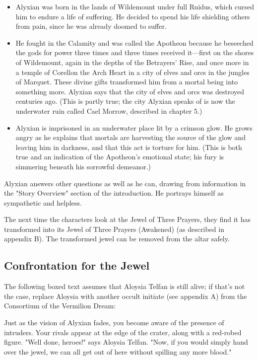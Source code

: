 \documentclass[10pt,a4paper,twoside,twocolumn,openany,nodeprecatedcode]{dndbook}
\begin{document}
\begin{itemize}
\item Alyxian was born in the lands of Wildemount under full Ruidus, which cursed him to endure a life of suffering. He decided to spend his life shielding others from pain, since he was already doomed to suffer.
\item He fought in the Calamity and was called the Apotheon because he beseeched the gods for power three times and three times received it—first on the shores of Wildemount, again in the depths of the Betrayers' Rise, and once more in a temple of Corellon the Arch Heart in a city of elves and orcs in the jungles of Marquet. These divine gifts transformed him from a mortal being into something more. Alyxian says that the city of elves and orcs was destroyed centuries ago. (This is partly true; the city Alyxian speaks of is now the underwater ruin called Cael Morrow, described in chapter 5.)
\item Alyxian is imprisoned in an underwater place lit by a crimson glow. He grows angry as he explains that mortals are harvesting the source of the glow and leaving him in darkness, and that this act is torture for him. (This is both true and an indication of the Apotheon's emotional state; his fury is simmering beneath his sorrowful demeanor.)
\end{itemize}

Alyxian answers other questions as well as he can, drawing from information in the "Story Overview" section of the introduction. He portrays himself as sympathetic and helpless.

The next time the characters look at the Jewel of Three Prayers, they find it has transformed into its Jewel of Three Prayers (Awakened) (as described in appendix B). The transformed jewel can be removed from the altar safely.

\subsection{Confrontation for the Jewel}
The following boxed text assumes that Aloysia Telfan is still alive; if that's not the case, replace Aloysia with another occult initiate (see appendix A) from the Consortium of the Vermilion Dream:

\begin{DndReadAloud}{}
Just as the vision of Alyxian fades, you become aware of the presence of intruders. Your rivals appear at the edge of the crater, along with a red-robed figure. "Well done, heroes!" says Aloysia Telfan. "Now, if you would simply hand over the jewel, we can all get out of here without spilling any more blood."

\end{DndReadAloud}
\end{document}
